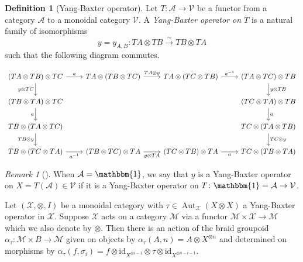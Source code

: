 \documentclass[reqno]{amsart}
\theoremstyle{definition}
\newtheorem{definition}[theorem]{Definition}
\theoremstyle{remark}
\newtheorem*{remark}{Remark}
\DeclareMathOperator{\Aut}{Aut}
\newcommand{\id}{{\mathrm{id}}}
\begin{document}
\begin{definition}[Yang-Baxter operator]
    Let $T \colon \mathcal{A} \to 
    \mathcal{V}$ be a functor from a category
    $\mathcal{A}$ to a monoidal category
    $\mathcal{V}$.
    A \textit{Yang-Baxter operator on $T$} is a natural family
    of isomorphisms
    \[
    y = y_{A,B} \colon
    T A \otimes TB \stackrel{\sim}{\to } TB \otimes TA
    \] 
    such that the following diagram commutes.

    \[\begin{tikzcd}\label{AA}
	{(TA \otimes TB) \otimes TC} & {TA \otimes(TB \otimes TC)} & {TA \otimes (TC \otimes TB)} & {(TA \otimes TC) \otimes TB} \\
	{(TB \otimes TA) \otimes TC} &&& {(TC \otimes TA) \otimes TB} \\
	{TB \otimes (TA \otimes TC)} &&& {TC \otimes (TA \otimes TB)} \\
	{TB \otimes (TC \otimes TA)} & {(TB \otimes TC) \otimes TA} & {(TC \otimes TB) \otimes TA} & {TC \otimes (TB \otimes TA)}
	\arrow["a", from=1-1, to=1-2]
	\arrow["{y \otimes TC}"', from=1-1, to=2-1]
	\arrow["{TA \otimes y}", from=1-2, to=1-3]
	\arrow["{a^{-1}}", from=1-3, to=1-4]
	\arrow["{y \otimes TB}", from=1-4, to=2-4]
	\arrow["a"', from=2-1, to=3-1]
	\arrow["a", from=2-4, to=3-4]
	\arrow["{TB \otimes y}"', from=3-1, to=4-1]
	\arrow["{TC \otimes y}", from=3-4, to=4-4]
	\arrow["{a^{-1}}"', from=4-1, to=4-2]
	\arrow["{y \otimes TA}"', from=4-2, to=4-3]
	\arrow["a"', from=4-3, to=4-4]
\end{tikzcd}\]

\end{definition}

\begin{remark}[]
    When $\mathcal{A} = \mathbbm{1}$, we say that
    $y$ is a Yang-Baxter operator on
    $X = T(\mathcal{A}) \in \mathcal{V}$ if
    it is a Yang-Baxter operator on 
    $T \colon \mathbbm{1} = \mathcal{A} \to 
    \mathcal{V}$.
\end{remark}


    Let $\left( \mathcal{X}, \otimes, I \right) $ be a
    monoidal category with $\tau \in 
    \Aut_{\mathcal{X}} \left( X \otimes X \right) $ 
    a Yang-Baxter operator in
    $\mathcal{X}$. Suppose
    $\mathcal{X}$ acts on a category
    $\mathcal{M}$ via a functor
    $\mathcal{M} \times \mathcal{X} \to \mathcal{M}$ 
    which we also denote by $\otimes$. Then 
    there is an action of the braid groupoid
     $\alpha_\tau \colon \mathcal{M} \times B \to 
     \mathcal{M}$ given on objects
     by
     $\alpha_{\tau} (A,n) = 
     A \otimes X^{\otimes n}$ and determined on morphisms
     by
     $\alpha_{\tau} \left( f, \sigma_i \right) 
     = f \otimes \id_{X^{\otimes i-1}} 
     \otimes \tau \otimes \id_{X^{\otimes n - i -1}}$.
\end{document}
